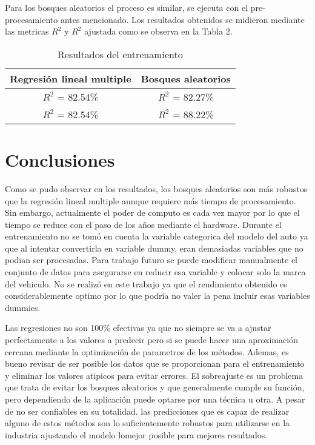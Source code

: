 \documentclass[conference]{IEEEtran}
\begin{document}
Para los bosques aleatorios el proceso es similar, se ejecuta con el pre-procesamiento antes mencionado. Los resultados obtenidos se midieron mediante las metricas $R^2$ y $R^2$ ajustada como se observa en la Tabla 2.

\begin{table}[h]
\begin{center}
\begin{tabular}{| c | c |}
\hline
Regresión lineal multiple & Bosques aleatorios \\ \hline
$R^2$ = 82.54\% & $R^2$ = 82.27\% \\ \hline
$R^2$ = 82.54\% & $R^2$ = 88.22\% \\ \hline
\end{tabular}
\caption{Resultados del entrenamiento}
\end{center}
\end{table}

\section*{Conclusiones}
Como se pudo observar en los resultados, los bosques aleatorios son más robustos que la regresión lineal multiple aunque requiere más tiempo de procesamiento. Sin embargo, actualmente el poder de computo es cada vez mayor por lo que el tiempo se reduce con el paso de los años mediante el hardware. Durante el entrenamiento no se tomó en cuenta la variable categorica del modelo del auto ya que al intentar convertirla en variable dummy, eran demasiadas variables que no podian ser procesadas. Para trabajo futuro se puede modificar manualmente el conjunto de datos para asegurarse en reducir esa variable y colocar solo la marca del vehiculo. No se realizó en este trabajo ya que el rendimiento obtenido es considerablemente optimo por lo que podría no valer la pena incluir esas variables dummies. 

Las regresiones no son 100\% efectivas ya que no siempre se va a ajustar perfectamente a los valores a predecir pero si se puede hacer una aproximación cercana mediante la optimización de parametros de los métodos. Ademas, es bueno revisar de ser posible los datos que se proporcionan para el entrenamiento y eliminar los valores atipicos para evitar errores. El sobreajuste es un problema que trata de evitar los bosques aleatorios y que generalmente cumple su función, pero dependiendo de la aplicación puede optarse por una técnica u otra. A pesar de no ser confiables en su totalidad. las predicciones que es capaz de realizar alguno de estos métodos son lo suficientemente robustos para utilizarse en la industria ajustando el modelo lomejor posible para mejores resultados. 
\end{document}
